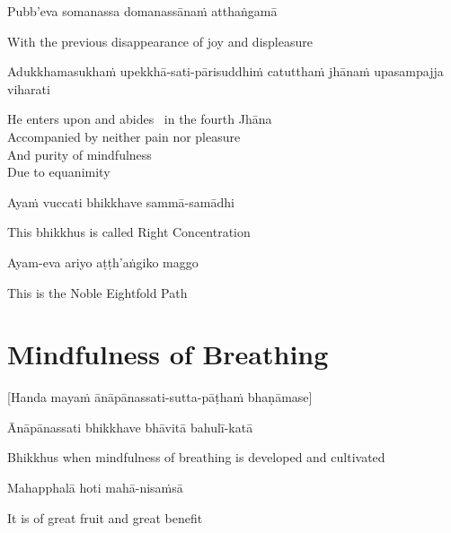 Pubb’eva somanassa domanassānaṁ atthaṅgamā

\begin{cprenglish}
  With the previous disappearance of joy and displeasure
\end{cprenglish}

Adukkhamasukhaṁ upekkhā-sati-pārisuddhiṁ catutthaṁ jhānaṁ upasampajja viharati

\begin{cprenglish}
  He enters upon and abides \breathmark\ in the fourth Jhāna\\
  Accompanied by neither pain nor pleasure\\
  And purity of mindfulness\\
  Due to equanimity
\end{cprenglish}

Ayaṁ vuccati bhikkhave sammā-samādhi

\begin{cprenglish}
  This bhikkhus is called Right Concentration
\end{cprenglish}

Ayam-eva ariyo aṭṭh'aṅgiko maggo

\begin{cprenglish}
  This is the Noble Eightfold Path
\end{cprenglish}

\suttaRef{[SN 45.8]}

\clearpage

\section{Mindfulness of Breathing}
\label{mindfulness-of-breathing}

\begin{center}
  [Handa mayaṁ ānāpānassati-sutta-pāṭhaṁ bhaṇāmase]
\end{center}

Ānāpānassati bhikkhave bhāvitā bahulī-katā

\begin{cprenglish}
  Bhikkhus when mindfulness of breathing is developed and cultivated
\end{cprenglish}

Mahapphalā hoti mahā-nisaṁsā

\begin{cprenglish}
  It is of great fruit and great benefit
\end{cprenglish}

